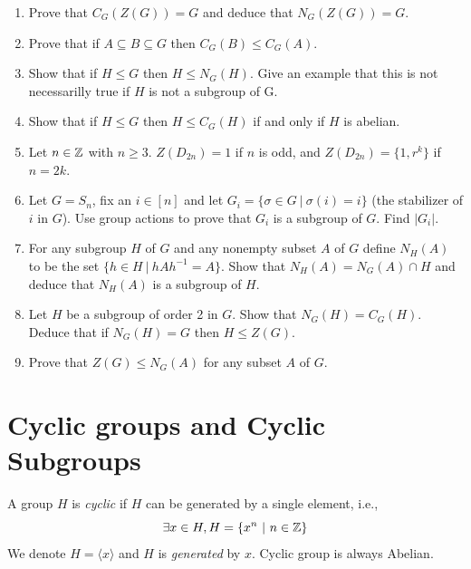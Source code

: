 \documentclass[12pt, a4paper, openany, twoside]{book}
\theoremstyle{definition}
\theoremstyle{remark}
\theoremstyle{plain}
\numberwithin{equation}{section}
\begin{document}
\begin{tcolorbox}[colback=yellow!10!white,colframe=violet!75!white,title=Exercise Sec 2.2.,breakable]

\begin{enumerate}
    \item Prove that $C_G(Z(G)) = G$ and deduce that $N_G(Z(G)) = G$.
    \item Prove that if $A \subseteq B \subseteq G$ then $C_G(B) \leq C_G(A)$.
    \item Show that if $H \leq G$ then $H \leq N_G(H)$. Give an example that this is not necessarilly true if $H$ is not a subgroup of G. 
    \item Show that if $H \leq G$ then $H \leq C_G(H)$ if and only if $H$ is abelian. 
    \item Let $n \in {\mathbb {Z}}$ with $n \geq 3$. $Z(D_{2n}) = 1$ if $n$ is odd, and $Z(D_{2n}) = \{1, r^k\}$ if $n = 2k$.
    \item Let $G = S_n$, fix an $i \in [n]$ and let $G_i = \{\sigma \in G ~|~ \sigma(i) = i\}$ (the stabilizer of $i$ in $G$). Use group actions to prove that $G_i$ is a subgroup of $G$. Find $|G_i|$. 
    \item For any subgroup $H$ of $G$ and any nonempty subset $A$ of $G$ define $N_H(A)$ to be the set $\{h \in H ~|~ hAh^{-1} = A\}$. Show that $N_H(A) = N_G(A) \cap H$ and deduce that $N_H(A)$ is a subgroup of $H$. 
    \item Let $H$ be a subgroup of order 2 in $G$. Show that $N_G(H) = C_G(H)$. Deduce that if $N_G(H) = G$ then $H \leq Z(G)$. 
    \item Prove that $Z(G) \leq N_G(A)$ for any subset $A$ of $G$. 
\end{enumerate}

\end{tcolorbox}

\newpage 

\section{Cyclic groups and Cyclic Subgroups}

\begin{tcolorbox}[colback=yellow!10!white,colframe=brown!75!black,title=Cyclic Group]

A group $H$ is \textit{cyclic} if $H$ can be generated by a single element, i.e., 
\[\exists x \in H, H = \{x^n ~|~ n \in {\mathbb {Z}}\}\]
We denote $H = \langle x \rangle$ and $H$ is \textit{generated} by $x$. Cyclic group is always Abelian. 
\end{tcolorbox}
\end{document}
